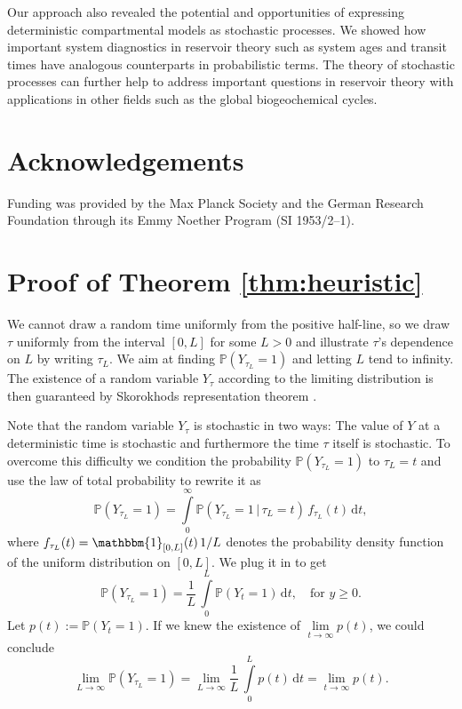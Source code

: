 \documentclass[smallextended]{svjour3}
\renewcommand{\P}{\mathbb{P}}
\newcommand{\intl}{\int\limits}
\newcommand{\liml}{\lim\limits}
\begin{document}
Our approach also revealed the potential and opportunities of expressing deterministic compartmental models as stochastic processes. We showed how important
system diagnostics in reservoir theory such as system ages and transit times have analogous counterparts in probabilistic terms. The theory of
stochastic processes can further help to address important questions in reservoir theory with applications in other fields such as the global biogeochemical cycles.


\section{Acknowledgements}
Funding was provided by the Max Planck Society and the German Research Foundation through its Emmy Noether Program (SI 1953/2--1).

\appendix

\section{Proof of Theorem \ref{thm:heuristic}}\label{appendix:heuristic}
We cannot draw a random time uniformly from the positive half-line, so we draw $\tau$ uniformly from the interval $[0,L]$ for some $L>0$ and illustrate $\tau$'s dependence on $L$ by writing $\tau_L$.
We aim at finding $\P(Y_{\tau_L}=1)$ and letting $L$ tend to infinity. The existence of a random variable $Y_\tau$ according to the limiting distribution is then guaranteed by Skorokhods representation theorem \citep{Billingsley1968}.

Note that the random variable $Y_\tau$ is stochastic in two ways: The value of $Y$ at a deterministic time is stochastic and furthermore the time $\tau$ itself is stochastic.
To overcome this difficulty we condition the probability $\P(Y_{\tau_L}=1)$ to $\tau_L=t$ and use the law of total probability to rewrite it as
\[
    \P(Y_{\tau_L}=1) = \intl_0^\infty\P(Y_{\tau_L}=1\,|\,\tau_L=t)\,f_{\tau_L}(t)\,\mathrm{d}t,
\]
where $f_{\tau_L}(t)=\mathbbm{1}_{[0,L]}(t)\,1/L$ denotes the probability density function of the uniform distribution on $[0,L]$.
We plug it in to get
\[
    \P(Y_{\tau_L}=1) = \frac{1}{L}\,\intl_0^L \P(Y_t=1)\,\mathrm{d}t,\quad\text{for }y\geq0.
\]
Let $p(t):=\P(Y_t=1)$.
If we knew the existence of $\liml_{t\to\infty} p(t)$, we could conclude
\begin{equation}\label{eqn:limitsequal}
    \liml_{L\to\infty}\P(Y_{\tau_L}=1) = \liml_{L\to\infty} \frac{1}{L}\,\intl_0^L p(t)\,\mathrm{d}t = \liml_{t\to\infty} p(t).
\end{equation}
\end{document}
